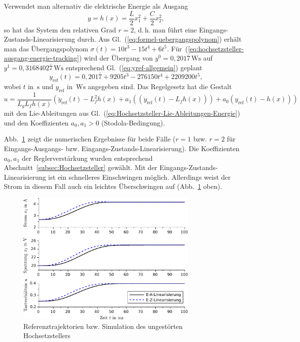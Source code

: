 Verwendet man alternativ die elektrische Energie als Ausgang 
\begin{equation}
y=h(x)=\frac{L}{2}x_{1}^{2}+\frac{C}{2}x_{2}^{2},\label{eq:hochsetzsteller-ausgang-energie-tracking}
\end{equation}
so hat das System den relativen Grad $r=2$, d.\,h. man führt eine
Eingangs-Zustands-Linearisierung durch. Aus Gl.~(\ref{eq:formel-uebergangspolynom})
erhält man das Übergangspolynom $\sigma(t)=10t^{3}-15t^{4}+6t^{5}$.
Für~(\ref{eq:hochsetzsteller-ausgang-energie-tracking}) wird der
Übergang von $y^{0}=0,201\bar{7}\,\text{Ws}$ auf $y^{1}=0,3168402\bar{7}\,\text{Ws}$
entsprechend Gl.~(\ref{eq:yref-allgemein}) geplant 
\begin{equation}
y_{\text{ref}}(t)=0,201\bar{7}+9205t^{3}-276150t^{4}+2209200t^{5},\label{eq:hochsetzsteller-yref-energie}
\end{equation}
wobei $t$ in~$\text{s}$ und $y_{\text{ref}}$ in~$\text{Ws}$
angegeben sind. Das Regelgesetz hat die Gestalt 
\[
u=\frac{1}{L_{g}L_{f}h(x)}\left(\ddot{y}_{\text{ref}}(t)\!-\!L_{f}^{2}h(x)+a_{1}((\dot{y}_{\text{ref}}(t)\!-\!L_{f}h(x)))+a_{0}(y_{\text{ref}}(t)\!-\!h(x))\right)
\]
mit den Lie-Ableitungen aus Gl.~(\ref{eq:Hochsetzsteller-Lie-Ableitungen-Energie})
und den Koeffizienten $a_{0},a_{1}>0$ (Stodola-Bedingung).

Abb.~\ref{fig:Hochsetzsteller-Tracking} zeigt die numerischen Ergebnisse
für beide Fälle ($r=1$ bzw. $r=2$ für Eingangs-Ausgangs- bzw. Eingangs-Zustands-Linearisierung).
Die Koeffizienten $a_{0},a_{1}$ der Reglerverstärkung wurden entsprechend
Abschnitt~\ref{subsec:Hochsetzsteller} gewählt. Mit der Eingangs-Zustands-Linearisierung
ist ein schnelleres Einschwingen möglich. Allerdings weist der Strom
in diesem Fall auch ein leichtes Überschwingen auf (Abb.~\ref{fig:Hochsetzsteller-Tracking}
oben).

\begin{figure}
\begin{centering}
\includegraphics[width=0.8\textwidth]{Hochsetzsteller_Tracking_FB}
\par\end{centering}
\caption{Referenztrajektorien bzw. Simulation des ungestörten Hochsetzstellers\label{fig:Hochsetzsteller-Tracking}}
\end{figure}


